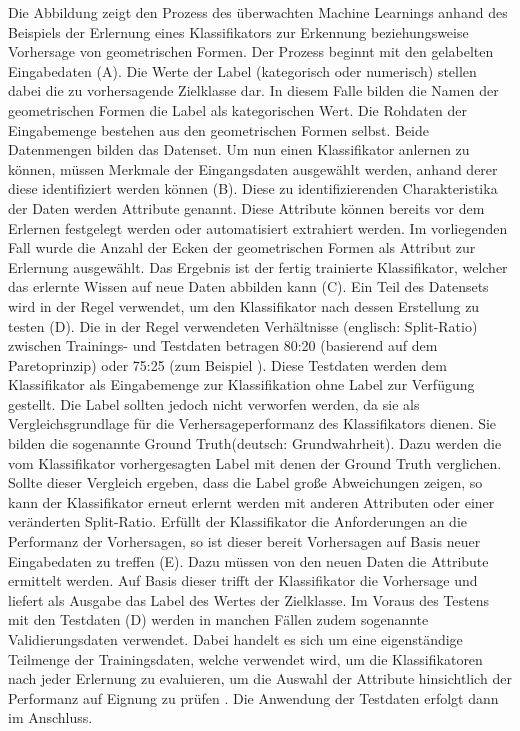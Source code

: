 Die Abbildung zeigt den Prozess des überwachten Machine Learnings anhand des Beispiels der Erlernung eines Klassifikators zur Erkennung beziehungsweise Vorhersage von geometrischen Formen. Der Prozess beginnt mit den \glqq gelabelten\grqq{} Eingabedaten (A). Die Werte der Label (kategorisch oder numerisch) stellen dabei die zu vorhersagende Zielklasse dar. In diesem Falle bilden die Namen der geometrischen Formen die Label als kategorischen Wert. Die Rohdaten der Eingabemenge bestehen aus den geometrischen Formen selbst. Beide Datenmengen bilden das Datenset. Um nun einen Klassifikator anlernen zu können, müssen Merkmale der Eingangsdaten ausgewählt werden, anhand derer diese identifiziert werden können (B). Diese zu identifizierenden Charakteristika der Daten werden Attribute genannt. Diese Attribute können bereits vor dem Erlernen festgelegt werden oder automatisiert extrahiert werden. Im vorliegenden Fall wurde die Anzahl der Ecken der geometrischen Formen als Attribut zur Erlernung ausgewählt. Das Ergebnis ist der fertig trainierte Klassifikator, welcher das erlernte Wissen auf neue Daten abbilden kann (C). Ein Teil des Datensets wird in der Regel verwendet, um den Klassifikator nach dessen Erstellung zu testen (D). Die in der Regel verwendeten Verhältnisse (englisch: Split-Ratio) zwischen Trainings- und Testdaten betragen 80:20 (basierend auf dem Paretoprinzip) oder 75:25 (zum Beispiel \cite{Queiroz2016}). Diese Testdaten werden dem Klassifikator als Eingabemenge zur Klassifikation ohne Label zur Verfügung gestellt. Die Label sollten jedoch nicht verworfen werden, da sie als Vergleichsgrundlage für die Verhersageperformanz des Klassifikators dienen. Sie bilden die sogenannte \glqq Ground Truth\grqq (deutsch: Grundwahrheit). Dazu werden die vom Klassifikator vorhergesagten Label mit denen der Ground Truth verglichen. Sollte dieser Vergleich ergeben, dass die Label große Abweichungen zeigen, so kann der Klassifikator erneut erlernt werden mit anderen Attributen oder einer veränderten Split-Ratio. Erfüllt der Klassifikator die Anforderungen an die Performanz der Vorhersagen, so ist dieser bereit Vorhersagen auf Basis neuer Eingabedaten zu treffen (E). Dazu müssen von den neuen Daten die Attribute ermittelt werden. Auf Basis dieser trifft der Klassifikator die Vorhersage und liefert als Ausgabe das Label des Wertes der Zielklasse. Im Voraus des Testens mit den Testdaten (D) werden in manchen Fällen zudem sogenannte Validierungsdaten verwendet. Dabei handelt es sich um eine eigenständige Teilmenge der Trainingsdaten, welche verwendet wird, um die Klassifikatoren nach jeder Erlernung zu evaluieren, um die Auswahl der Attribute hinsichtlich der Performanz auf Eignung zu prüfen \cite{Sammut2017}. Die Anwendung der Testdaten erfolgt dann im Anschluss.

